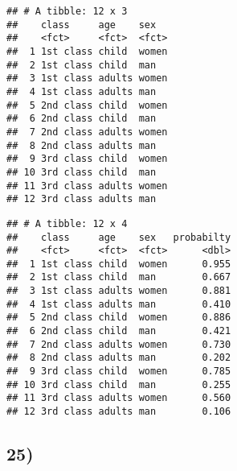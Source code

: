 \documentclass[
]{article}
\newenvironment{Shaded}{\begin{snugshade}}{\end{snugshade}}
\newcommand{\AttributeTok}[1]{\textcolor[rgb]{0.77,0.63,0.00}{#1}}
\newcommand{\FloatTok}[1]{\textcolor[rgb]{0.00,0.00,0.81}{#1}}
\newcommand{\FunctionTok}[1]{\textcolor[rgb]{0.00,0.00,0.00}{#1}}
\newcommand{\NormalTok}[1]{#1}
\newcommand{\OtherTok}[1]{\textcolor[rgb]{0.56,0.35,0.01}{#1}}
\newcommand{\SpecialCharTok}[1]{\textcolor[rgb]{0.00,0.00,0.00}{#1}}
\newcommand{\StringTok}[1]{\textcolor[rgb]{0.31,0.60,0.02}{#1}}
\begin{document}
\begin{verbatim}
## # A tibble: 12 x 3
##    class     age    sex  
##    <fct>     <fct>  <fct>
##  1 1st class child  women
##  2 1st class child  man  
##  3 1st class adults women
##  4 1st class adults man  
##  5 2nd class child  women
##  6 2nd class child  man  
##  7 2nd class adults women
##  8 2nd class adults man  
##  9 3rd class child  women
## 10 3rd class child  man  
## 11 3rd class adults women
## 12 3rd class adults man
\end{verbatim}

\begin{Shaded}
\end{Shaded}

\begin{verbatim}
## # A tibble: 12 x 4
##    class     age    sex   probabilty
##    <fct>     <fct>  <fct>      <dbl>
##  1 1st class child  women      0.955
##  2 1st class child  man        0.667
##  3 1st class adults women      0.881
##  4 1st class adults man        0.410
##  5 2nd class child  women      0.886
##  6 2nd class child  man        0.421
##  7 2nd class adults women      0.730
##  8 2nd class adults man        0.202
##  9 3rd class child  women      0.785
## 10 3rd class child  man        0.255
## 11 3rd class adults women      0.560
## 12 3rd class adults man        0.106
\end{verbatim}

\hypertarget{section-23}{%
\subsection{25)}\label{section-23}}

\begin{Shaded}
\end{Shaded}
\end{document}
